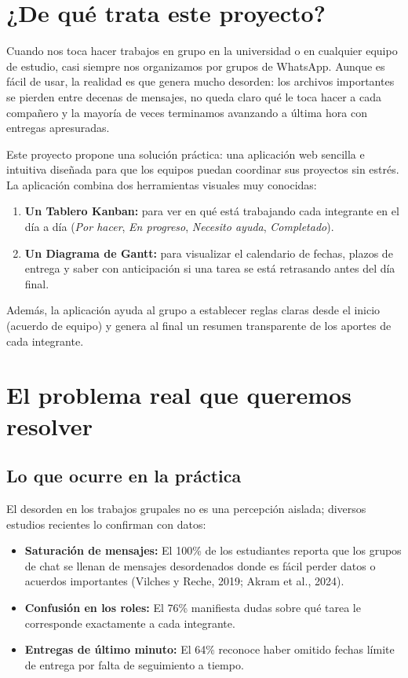 \documentclass[11pt,a4paper]{article}
\begin{document}
\tableofcontents
\newpage


\section{¿De qué trata este proyecto?}
Cuando nos toca hacer trabajos en grupo en la universidad o en cualquier equipo de estudio, casi siempre nos organizamos por grupos de WhatsApp. Aunque es fácil de usar, la realidad es que genera mucho desorden: los archivos importantes se pierden entre decenas de mensajes, no queda claro qué le toca hacer a cada compañero y la mayoría de veces terminamos avanzando a última hora con entregas apresuradas.

Este proyecto propone una solución práctica: una aplicación web sencilla e intuitiva diseñada para que los equipos puedan coordinar sus proyectos sin estrés. La aplicación combina dos herramientas visuales muy conocidas:
\begin{enumerate}
    \item \textbf{Un Tablero Kanban:} para ver en qué está trabajando cada integrante en el día a día (\textit{Por hacer}, \textit{En progreso}, \textit{Necesito ayuda}, \textit{Completado}).
    \item \textbf{Un Diagrama de Gantt:} para visualizar el calendario de fechas, plazos de entrega y saber con anticipación si una tarea se está retrasando antes del día final.
\end{enumerate}

Además, la aplicación ayuda al grupo a establecer reglas claras desde el inicio (acuerdo de equipo) y genera al final un resumen transparente de los aportes de cada integrante.

\section{El problema real que queremos resolver}

\subsection{Lo que ocurre en la práctica}
El desorden en los trabajos grupales no es una percepción aislada; diversos estudios recientes lo confirman con datos:
\begin{itemize}
    \item \textbf{Saturación de mensajes:} El 100\% de los estudiantes reporta que los grupos de chat se llenan de mensajes desordenados donde es fácil perder datos o acuerdos importantes (Vilches y Reche, 2019; Akram et al., 2024).
    \item \textbf{Confusión en los roles:} El 76\% manifiesta dudas sobre qué tarea le corresponde exactamente a cada integrante.
    \item \textbf{Entregas de último minuto:} El 64\% reconoce haber omitido fechas límite de entrega por falta de seguimiento a tiempo.
\end{itemize}
\end{document}
